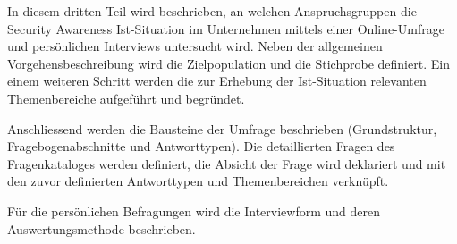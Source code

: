 \documentclass[../../main.tex]{subfiles}
\begin{document}
\begin{sloppypar}
In diesem dritten Teil wird beschrieben, an welchen Anspruchsgruppen die Security Awareness Ist-Situation im Unternehmen mittels einer Online-Umfrage und persönlichen Interviews untersucht wird. Neben der allgemeinen Vorgehensbeschreibung wird die Zielpopulation und die Stichprobe definiert. Ein einem weiteren Schritt werden die zur Erhebung der Ist-Situation relevanten Themenbereiche aufgeführt und begründet.

Anschliessend werden die Bausteine der Umfrage beschrieben (Grundstruktur, Fragebogenabschnitte und Antworttypen). Die detaillierten Fragen des Fragenkataloges werden definiert, die Absicht der Frage wird deklariert und mit den zuvor definierten Antworttypen und Themenbereichen verknüpft.

Für die persönlichen Befragungen wird die Interviewform und deren Auswertungsmethode beschrieben. 
\end{sloppypar}
\end{document}
